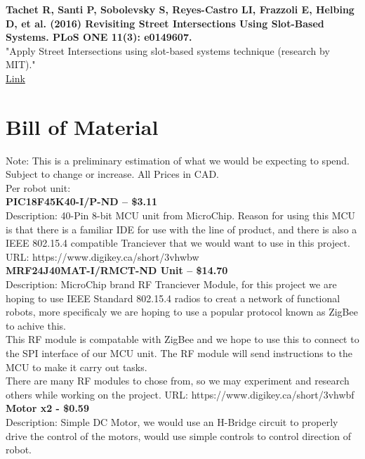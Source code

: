 \documentclass[a4paper]{article}
\begin{document}
	\textbf{Tachet R, Santi P, Sobolevsky S, Reyes-Castro LI, Frazzoli E, Helbing D, et al. (2016) Revisiting Street Intersections Using Slot-Based Systems. PLoS ONE 11(3): e0149607.}\\
	"Apply Street Intersections using slot-based systems technique (research by MIT)."\\
	\href{https://doi.org/10.1371/journal.pone.0149607}{Link}\\
	
	\section*{Bill of Material}
	Note: This is a preliminary estimation of what we would be expecting to spend. Subject to change or increase. All Prices in CAD. \\
	Per robot unit: \\
	
	\textbf{PIC18F45K40-I/P-ND – \$3.11} \\
	Description: 40-Pin 8-bit MCU unit from MicroChip. Reason for using this MCU is that there is a familiar IDE for use with the line of product, and there is also a IEEE 802.15.4 compatible Tranciever that we would want to use in this project.
	URL: https://www.digikey.ca/short/3vhwbw \\
	
	\textbf{MRF24J40MAT-I/RMCT-ND Unit – \$14.70} \\
	Description: MicroChip brand RF Tranciever Module, for this project we are hoping to use IEEE Standard 802.15.4 radios to creat a network of functional robots, more specificaly we are hoping to use a popular protocol known as ZigBee to achive this. \\
	
	This RF module is compatable with ZigBee and we hope to use this to connect to the SPI interface of our MCU unit. The RF module will send instructions to the MCU to make it carry out tasks. \\
	
	There are many RF modules to chose from, so we may experiment and research others while working on the project.
	URL: https://www.digikey.ca/short/3vhwbf \\
	
	
	\textbf{Motor x2 - \$0.59} \\
	Description: Simple DC Motor, we would use an H-Bridge circuit to properly drive the control of the motors, would use simple controls to control direction of robot. \\ \\
	
\end{document}
